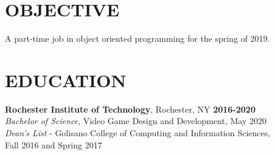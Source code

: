 \documentclass[line,margin]{res}
\begin{document}

\noindent
\makebox[0pt][l]{}%
\makebox[\textwidth][c]{}%
\makebox[0pt][l]{}%
\makebox[\textwidth][c]{}%
\makebox[0pt][l]{}%
\makebox[\textwidth][c]{}%



\begin{resume}

\section{OBJECTIVE}
A part-time job in object oriented programming for the spring of 2019.



\section{EDUCATION}
\textbf{Rochester Institute of Technology}, Rochester, NY\hfill
    \textbf{2016-2020}\\
{\sl Bachelor of Science}, Video Game Design and Development, May 2020
\\
{\sl Dean's List} - Golisano College of Computing and Information Sciences,\hfill \\ Fall 2016 and Spring 2017

\end{resume}
\end{document}
